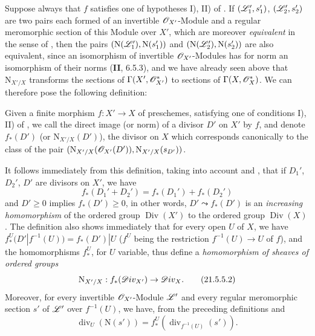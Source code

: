 \begin{env}[21.5.4]
\label{IV.21.5.4}
Suppose always that $f$ satisfies one of hypotheses I), II) of .
If $(\mathscr{L}_1',s_1')$, $(\mathscr{L}_2',s_2')$ are two pairs each formed of an invertible $\mathscr{O}_{X'}$-Module and a regular meromorphic section of this Module over $X'$, which are moreover \emph{equivalent} in the sense of , then the pairs $(\mathrm{N}(\mathscr{L}_1'),\mathrm{N}(s_1'))$ and $(\mathrm{N}(\mathscr{L}_2'),\mathrm{N}(s_2'))$ are also equivalent, since an isomorphism of invertible $\mathscr{O}_{X'}$-Modules has for norm an isomorphism of their norms (\textbf{II}, 6.5.3), and we have already seen above that $\mathrm{N}_{X'/X}$ transforms the sections of $\Gamma(X',\mathscr{O}_{X'}^*)$ to sections of $\Gamma(X,\mathscr{O}_X^*)$.
We can therefore pose the following definition:
\end{env}


\begin{definition}[21.5.5]
\label{IV.21.5.5}
Given a finite morphism $f:X'\to X$ of preschemes, satisfying one of conditions \textup{I), II)} of , we call the direct image (or norm) of a divisor $D'$ on $X'$ by $f$, and denote $f_*(D')$ \textup{(}or $\mathrm{N}_{X'/X}(D')$\textup{)}, the divisor on $X$ which corresponds canonically  to the class of the pair $(\mathrm{N}_{X'/X}(\mathscr{O}_{X'}(D')),\mathrm{N}_{X'/X}(s_{D'}))$.
\end{definition}

It follows immediately from this definition, taking into account  and , that if $D_1'$, $D_2'$, $D'$ are divisors on $X'$, we have
\[
\label{IV.21.5.5.1}
  f_*(D_1'+D_2')=f_*(D_1')+f_*(D_2')
  \tag{21.5.5.1}
\]
and $D'\geq 0$ implies $f_*(D')\geq 0$, in other words, $D'\leadsto f_*(D')$ is an \emph{increasing homomorphism} of the ordered group $\operatorname{Div}(X')$ to the ordered group $\operatorname{Div}(X)$.
The definition  also shows immediately that for every open $U$ of $X$, we have $f_*^U(D'|f^{-1}(U))=f_*(D')|U$ ($f^U$ being the restriction $f^{-1}(U)\to U$ of $f$), and the homomorphisms $f_*^U$, for $U$ variable, thus define a \emph{homomorphism of sheaves of ordered groups}
\[
\label{IV.21.5.5.2}
  \mathrm{N}_{X'/X}:f_*(\mathscr{D}iv_{X'})\to\mathscr{D}iv_X.
  \tag{21.5.5.2}
\]
Moreover, for every invertible $\mathscr{O}_{X'}$-Module $\mathscr{L}'$ and every regular meromorphic section $s'$ of $\mathscr{L}'$ over $f^{-1}(U)$, we have, from the preceding definitions and 
\[
\label{IV.21.5.5.3}
  \operatorname{div}_U(\mathrm{N}(s'))=f_*^U(\operatorname{div}_{f^{-1}(U)}(s')).
  \tag{21.5.5.3}
\]

